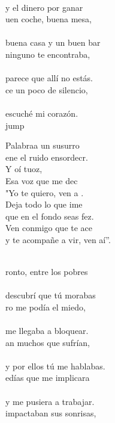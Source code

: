 \begin{cancion}
	\jump\\
y el dinero por ganar\\
	uen coche, buena mesa, \\
	\jump\\
buena casa y un buen bar\\
	 ninguno te encontraba, \\
	\jump\\
parece que allí no estás.\\
	ce un poco de silencio, \\
	\jump\\
escuché mi corazón.\\jump\\
	\begin{chorus}%
	 Palabraa un susurro \\
	ene el ruido ensordecr.\\
	Y oí tuoz,\\
	Esa voz que me dec \\
	"Yo te quiero, ven a . \\
	Deja todo lo que ime \\
	que en el fondo seas fez.\\
	Ven conmigo que te ace \\
	y te acompañe a vir, ven aí”.\\
	\end{chorus}%
	\jump\\
	ronto, entre los pobres \\
	\jump\\
descubrí que tú morabas\\
	ro me podía el miedo, \\
	\jump\\
me llegaba a bloquear.\\
	an muchos que sufrían, \\
	\jump\\
y por ellos tú me hablabas.\\
	edías que me implicara \\
	\jump\\
y me pusiera a trabajar.\\
	 impactaban sus sonrisas, \\

\end{cancion}
